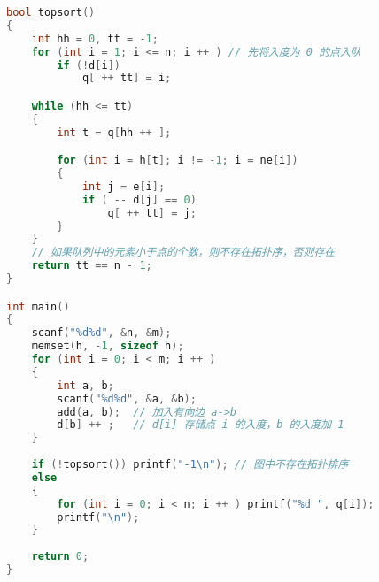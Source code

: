 \begin{lstlisting}[language=cpp]
bool topsort()
{
    int hh = 0, tt = -1;
    for (int i = 1; i <= n; i ++ ) // 先将入度为 0 的点入队
        if (!d[i])
            q[ ++ tt] = i;

    while (hh <= tt)
    {
        int t = q[hh ++ ];

        for (int i = h[t]; i != -1; i = ne[i])
        {
            int j = e[i];
            if ( -- d[j] == 0)
                q[ ++ tt] = j;
        }
    }
    // 如果队列中的元素小于点的个数，则不存在拓扑序，否则存在
    return tt == n - 1;
}

int main()
{
    scanf("%d%d", &n, &m);
    memset(h, -1, sizeof h);
    for (int i = 0; i < m; i ++ )
    {
        int a, b;
        scanf("%d%d", &a, &b);
        add(a, b);  // 加入有向边 a->b
        d[b] ++ ;   // d[i] 存储点 i 的入度，b 的入度加 1
    }
    
    if (!topsort()) printf("-1\n"); // 图中不存在拓扑排序
    else
    {
        for (int i = 0; i < n; i ++ ) printf("%d ", q[i]);
        printf("\n");
    }
    
    return 0;
}
\end{lstlisting}
